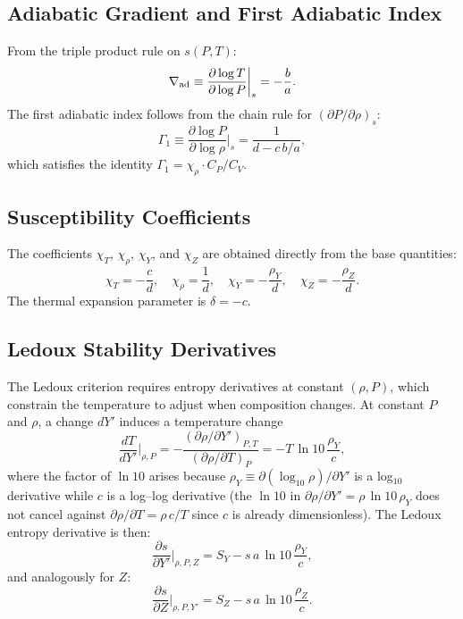 \documentclass[twocolumn]{aastex701}
\begin{document}
\subsection{Adiabatic Gradient and First Adiabatic Index}

From the triple product rule on $s(P, T)$:
\begin{equation}\label{eq:nabla_ad_identity}
    \nabla_{\rm ad} \equiv \frac{\partial\log T}{\partial\log P}\bigg|_s = -\frac{b}{a}.
\end{equation}
The first adiabatic index follows from the chain rule for $(\partial P/\partial\rho)_s$:
\begin{equation}\label{eq:gamma1_identity}
    \Gamma_1 \equiv \frac{\partial\log P}{\partial\log\rho}\bigg|_s = \frac{1}{d - c\,b/a},
\end{equation}
which satisfies the identity $\Gamma_1 = \chi_\rho \cdot C_P / C_V$.

\subsection{Susceptibility Coefficients}

The coefficients $\chi_T$, $\chi_\rho$, $\chi_Y$, and $\chi_Z$ are obtained directly from the base quantities:
\begin{equation}\label{eq:chi_identity}
    \chi_T = -\frac{c}{d}, \quad
    \chi_\rho = \frac{1}{d}, \quad
    \chi_Y = -\frac{\rho_Y}{d}, \quad
    \chi_Z = -\frac{\rho_Z}{d}.
\end{equation}
The thermal expansion parameter is $\delta = -c$.

\subsection{Ledoux Stability Derivatives}\label{sec:ledoux_id}

The Ledoux criterion requires entropy derivatives at constant $(\rho, P)$, which constrain the temperature to adjust when composition changes.
At constant $P$ and $\rho$, a change $dY'$ induces a temperature change
\begin{equation}
    \frac{dT}{dY'}\bigg|_{\rho,P} = -\frac{(\partial\rho/\partial Y')_{P,T}}{(\partial\rho/\partial T)_P} = -T\,\ln 10\, \frac{\rho_Y}{c},
\end{equation}
where the factor of $\ln 10$ arises because $\rho_Y \equiv \partial(\log_{10}\rho)/\partial Y'$ is a log$_{10}$ derivative while $c$ is a log--log derivative (the $\ln 10$ in $\partial\rho/\partial Y' = \rho\,\ln 10\,\rho_Y$ does not cancel against $\partial\rho/\partial T = \rho\,c/T$ since $c$ is already dimensionless).
The Ledoux entropy derivative is then:
\begin{equation}\label{eq:ledoux_y}
    \frac{\partial s}{\partial Y'}\bigg|_{\rho,P,Z} = S_Y - s\,a\,\ln 10\,\frac{\rho_Y}{c},
\end{equation}
and analogously for $Z$:
\begin{equation}\label{eq:ledoux_z}
    \frac{\partial s}{\partial Z}\bigg|_{\rho,P,Y'} = S_Z - s\,a\,\ln 10\,\frac{\rho_Z}{c}.
\end{equation}
\end{document}
